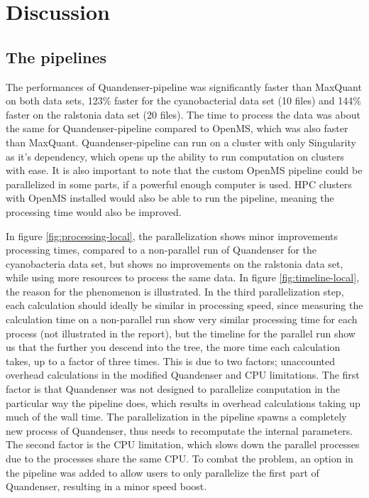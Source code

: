 \section{Discussion}

\subsection{The pipelines}
The performances of Quandenser-pipeline was significantly faster than MaxQuant on both data sets, 123\% faster for the cyanobacterial data set (10 files) and 144\% faster on the ralstonia data set (20 files). The time to process the data was about the same for Quandenser-pipeline compared to OpenMS, which was also faster than MaxQuant. Quandenser-pipeline can run on a cluster with only Singularity as it's dependency, which opens up the ability to run computation on clusters with ease. It is also important to note that the custom OpenMS pipeline could be parallelized in some parts, if a powerful enough computer is used. HPC clusters with OpenMS installed would also be able to run the pipeline, meaning the processing time would also be improved.

In figure \ref{fig:processing-local}, the parallelization shows minor improvements processing times, compared to a non-parallel run of Quandenser for the cyanobacteria data set, but shows no improvements on the ralstonia data set, while using more resources to process the same data. In figure \ref{fig:timeline-local}, the reason for the phenomenon is illustrated. In the third parallelization step, each calculation should ideally be similar in processing speed, since measuring the calculation time on a non-parallel run show very similar processing time for each process (not illustrated in the report), but the timeline for the parallel run show us that the further you descend into the tree, the more time each calculation takes, up to a factor of three times. This is due to two factors; unaccounted overhead calculations in the modified Quandenser and CPU limitations. The first factor is that Quandenser was not designed to parallelize computation in the particular way the pipeline does, which results in overhead calculations taking up much of the wall time. The parallelization in the pipeline spawns a completely new process of Quandenser, thus needs to recomputate the internal parameters. The second factor is the CPU limitation, which slows down the parallel processes due to the processes share the same CPU. To combat the problem, an option in the pipeline was added to allow users to only parallelize the first part of Quandenser, resulting in a minor speed boost.

